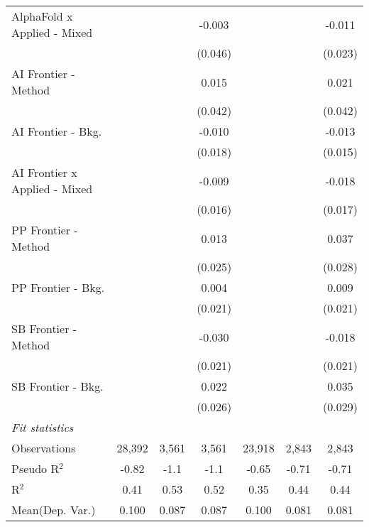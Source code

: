 \begin{tabular}{lcccccc}
   AlphaFold x Applied - Mixed   &             &                & -0.003  &             &              & -0.011\\   
                                 &             &                & (0.046) &             &              & (0.023)\\   
   AI Frontier - Method          &             &                & 0.015   &             &              & 0.021\\   
                                 &             &                & (0.042) &             &              & (0.042)\\   
   AI Frontier - Bkg.            &             &                & -0.010  &             &              & -0.013\\   
                                 &             &                & (0.018) &             &              & (0.015)\\   
   AI Frontier x Applied - Mixed &             &                & -0.009  &             &              & -0.018\\   
                                 &             &                & (0.016) &             &              & (0.017)\\   
   PP Frontier - Method          &             &                & 0.013   &             &              & 0.037\\   
                                 &             &                & (0.025) &             &              & (0.028)\\   
   PP Frontier - Bkg.            &             &                & 0.004   &             &              & 0.009\\   
                                 &             &                & (0.021) &             &              & (0.021)\\   
   SB Frontier - Method          &             &                & -0.030  &             &              & -0.018\\   
                                 &             &                & (0.021) &             &              & (0.021)\\   
   SB Frontier - Bkg.            &             &                & 0.022   &             &              & 0.035\\   
                                 &             &                & (0.026) &             &              & (0.029)\\   
   \midrule
   \emph{Fit statistics}\\
   Observations                  & 28,392      & 3,561          & 3,561   & 23,918      & 2,843        & 2,843\\  
   Pseudo R$^2$                  & -0.82       & -1.1           & -1.1    & -0.65       & -0.71        & -0.71\\  
   R$^2$                         & 0.41        & 0.53           & 0.52    & 0.35        & 0.44         & 0.44\\  
Mean(Dep. Var.) & 0.100 & 0.087 & 0.087 & 0.100 & 0.081 & 0.081 \\
   

\end{tabular}
